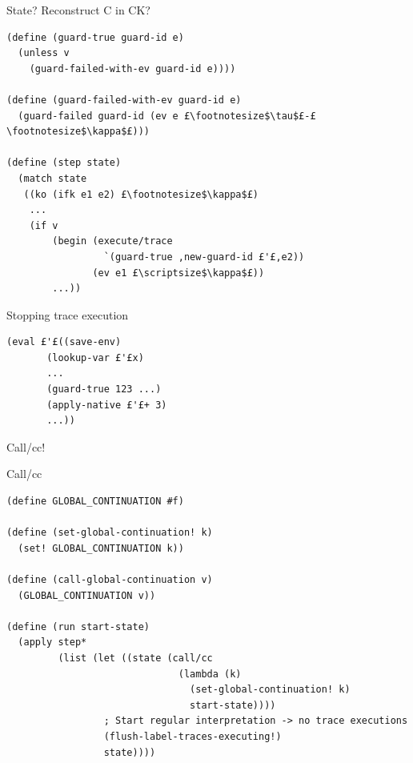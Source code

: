 \documentclass{beamer}
\begin{document}
\begin{frame}[fragile]{State?}
Reconstruct C in CK?

\begin{lstlisting}[basicstyle = \scriptsize\ttfamily, escapechar = £]
(define (guard-true guard-id e)
  (unless v
    (guard-failed-with-ev guard-id e))))
      
(define (guard-failed-with-ev guard-id e)
  (guard-failed guard-id (ev e £\footnotesize$\tau$£-£\footnotesize$\kappa$£)))

(define (step state)
  (match state
   ((ko (ifk e1 e2) £\footnotesize$\kappa$£)
    ...
    (if v
        (begin (execute/trace 
                 `(guard-true ,new-guard-id £'£,e2))
               (ev e1 £\scriptsize$\kappa$£))
        ...))
\end{lstlisting}
\end{frame}

\begin{frame}[fragile]{Stopping trace execution}

\begin{lstlisting}[basicstyle = \small\ttfamily, escapechar = £]
(eval £'£((save-env)
       (lookup-var £'£x)
       ...
       (guard-true 123 ...)
       (apply-native £'£+ 3)
       ...))
\end{lstlisting}

\pause

Call/cc!

\end{frame}

\begin{frame}[fragile]{Call/cc}
\begin{lstlisting}[basicstyle = \scriptsize\ttfamily, escapechar = £]
(define GLOBAL_CONTINUATION #f)

(define (set-global-continuation! k)
  (set! GLOBAL_CONTINUATION k))
  
(define (call-global-continuation v)
  (GLOBAL_CONTINUATION v))
  
(define (run start-state)
  (apply step*
         (list (let ((state (call/cc
                              (lambda (k)
                                (set-global-continuation! k)
                                start-state))))
                 ; Start regular interpretation -> no trace executions
                 (flush-label-traces-executing!)
                 state))))
\end{lstlisting}
\end{frame}
\end{document}
